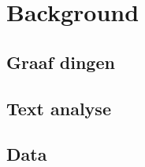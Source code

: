 \section*{Background}

\subsection*{Graaf dingen}



\subsection*{Text analyse \label{sec:text-background}}




\subsection*{Data}

